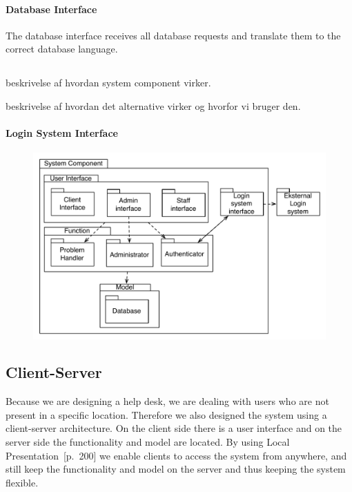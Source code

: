 \paragraph{Database Interface}
The database interface receives all database requests and translate them to the correct database language.

\subsection{}
beskrivelse af hvordan system component virker.

beskrivelse af hvordan det alternative virker og hvorfor vi bruger den.

\paragraph{Login System Interface}


\begin{figure}[]
	\centering
	\includegraphics[scale=0.5]{input/architectural_design/system_component_denalternative.pdf}
	\morscaption{}
	\label{fig:SystemComponent}
\end{figure}


\subsection{Client-Server}
Because we are designing a help desk, we are dealing with users who are not present in a specific location. Therefore we also designed the system using a client-server architecture.
On the client side there is a user interface and on the server side the functionality and model are located. By using Local Presentation~\cite{roedeaalborg}[p.~200] we enable clients to access the system from anywhere, and still keep the functionality and model on the server and thus keeping the system flexible.         

